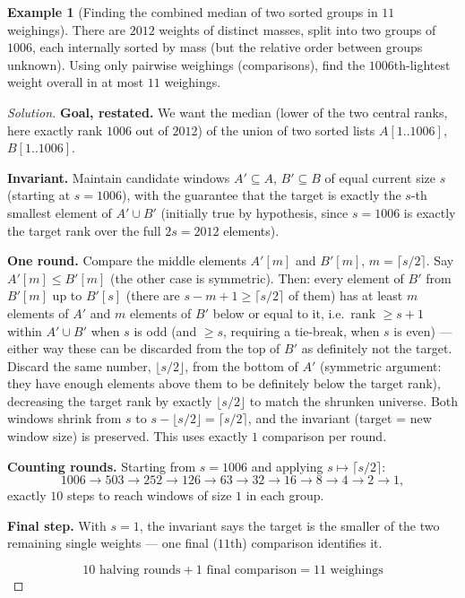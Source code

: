 \documentclass[11pt]{article}
\theoremstyle{definition}
\newtheorem{example}{Example}[section]
\begin{document}
\begin{example}[Finding the combined median of two sorted groups in $11$ weighings]
There are $2012$ weights of distinct masses, split into two groups of $1006$, each internally sorted by mass (but the relative order between groups unknown). Using only pairwise weighings (comparisons), find the $1006$th-lightest weight overall in at most $11$ weighings.
\end{example}
\begin{proof}[Solution]
\textbf{Goal, restated.} We want the median (lower of the two central ranks, here exactly rank $1006$ out of $2012$) of the union of two sorted lists $A[1..1006]$, $B[1..1006]$.

\textbf{Invariant.} Maintain candidate windows $A'\subseteq A$, $B'\subseteq B$ of equal current size $s$ (starting at $s=1006$), with the guarantee that the target is exactly the $s$-th smallest element of $A'\cup B'$ (initially true by hypothesis, since $s=1006$ is exactly the target rank over the full $2s=2012$ elements).

\textbf{One round.} Compare the middle elements $A'[m]$ and $B'[m]$, $m=\lceil s/2\rceil$. Say $A'[m]\le B'[m]$ (the other case is symmetric). Then: every element of $B'$ from $B'[m]$ up to $B'[s]$ (there are $s-m+1\ge\lceil s/2\rceil$ of them) has at least $m$ elements of $A'$ and $m$ elements of $B'$ below or equal to it, i.e.\ rank $\ge s+1$ within $A'\cup B'$ when $s$ is odd (and $\ge s$, requiring a tie-break, when $s$ is even) — either way these can be discarded from the top of $B'$ as definitely not the target. Discard the same number, $\lfloor s/2\rfloor$, from the bottom of $A'$ (symmetric argument: they have enough elements above them to be definitely below the target rank), decreasing the target rank by exactly $\lfloor s/2\rfloor$ to match the shrunken universe. Both windows shrink from $s$ to $s-\lfloor s/2\rfloor=\lceil s/2\rceil$, and the invariant (target = new window size) is preserved. This uses exactly $1$ comparison per round.

\textbf{Counting rounds.} Starting from $s=1006$ and applying $s\mapsto\lceil s/2\rceil$:
\[
1006\to503\to252\to126\to63\to32\to16\to8\to4\to2\to1,
\]
exactly $10$ steps to reach windows of size $1$ in each group.

\textbf{Final step.} With $s=1$, the invariant says the target is the smaller of the two remaining single weights — one final ($11$th) comparison identifies it.

\[
\boxed{10\text{ halving rounds}+1\text{ final comparison}=11\text{ weighings}}
\]
\end{proof}
\end{document}
